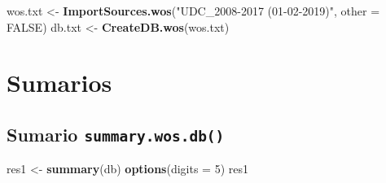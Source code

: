 \documentclass[
]{book}
\newenvironment{Shaded}{\begin{snugshade}}{\end{snugshade}}
\newcommand{\AttributeTok}[1]{\textcolor[rgb]{0.13,0.29,0.53}{#1}}
\newcommand{\ConstantTok}[1]{\textcolor[rgb]{0.56,0.35,0.01}{#1}}
\newcommand{\DecValTok}[1]{\textcolor[rgb]{0.00,0.00,0.81}{#1}}
\newcommand{\FunctionTok}[1]{\textcolor[rgb]{0.13,0.29,0.53}{\textbf{#1}}}
\newcommand{\NormalTok}[1]{#1}
\newcommand{\OtherTok}[1]{\textcolor[rgb]{0.56,0.35,0.01}{#1}}
\newcommand{\StringTok}[1]{\textcolor[rgb]{0.31,0.60,0.02}{#1}}
\begin{document}
\begin{Shaded}
\begin{Highlighting}[]
\NormalTok{wos.txt }\OtherTok{\textless{}{-}} \FunctionTok{ImportSources.wos}\NormalTok{(}\StringTok{"UDC\_2008{-}2017 (01{-}02{-}2019)"}\NormalTok{, }\AttributeTok{other =} \ConstantTok{FALSE}\NormalTok{)}
\NormalTok{db.txt }\OtherTok{\textless{}{-}} \FunctionTok{CreateDB.wos}\NormalTok{(wos.txt)}
\end{Highlighting}
\end{Shaded}

\hypertarget{sumarios}{%
\section{Sumarios}\label{sumarios}}

\hypertarget{sumario-summary.wos.db}{%
\subsection{\texorpdfstring{Sumario \texttt{summary.wos.db()}}{Sumario summary.wos.db()}}\label{sumario-summary.wos.db}}

\begin{Shaded}
\begin{Highlighting}[]
\NormalTok{res1 }\OtherTok{\textless{}{-}} \FunctionTok{summary}\NormalTok{(db)}
\FunctionTok{options}\NormalTok{(}\AttributeTok{digits =} \DecValTok{5}\NormalTok{)}
\NormalTok{res1}
\end{Highlighting}
\end{Shaded}
\end{document}
